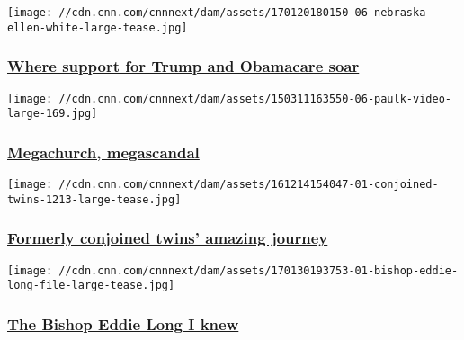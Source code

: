 \href{/2017/01/24/health/nebraska-trump-obamacare-aca-eprise/index.html}{}

\texttt{[image: //cdn.cnn.com/cnnnext/dam/assets/170120180150-06-nebraska-ellen-white-large-tease.jpg]}

\hypertarget{where-support-for-trump-and-obamacare-soar}{%
\subsubsection{\texorpdfstring{\href{/2017/01/24/health/nebraska-trump-obamacare-aca-eprise/index.html}{Where
support for Trump and Obamacare
soar}}{Where support for Trump and Obamacare soar}}\label{where-support-for-trump-and-obamacare-soar}}

\href{http://www.cnn.com/interactive/2015/03/living/ultimate-scandal-paulk/}{}

\texttt{[image: //cdn.cnn.com/cnnnext/dam/assets/150311163550-06-paulk-video-large-169.jpg]}

\hypertarget{megachurch-megascandal}{%
\subsubsection{\texorpdfstring{\href{http://www.cnn.com/interactive/2015/03/living/ultimate-scandal-paulk/}{Megachurch,
megascandal}}{Megachurch, megascandal}}\label{megachurch-megascandal}}

\href{/2017/09/07/health/conjoined-twins-go-home-main/index.html}{}

\texttt{[image: //cdn.cnn.com/cnnnext/dam/assets/161214154047-01-conjoined-twins-1213-large-tease.jpg]}

\hypertarget{formerly-conjoined-twins-amazing-journey}{%
\subsubsection{\texorpdfstring{\href{/2017/09/07/health/conjoined-twins-go-home-main/index.html}{Formerly
conjoined twins' amazing
journey}}{Formerly conjoined twins' amazing journey}}\label{formerly-conjoined-twins-amazing-journey}}

\href{/2017/02/03/us/bishop-eddie-long-i-knew/index.html}{}

\texttt{[image: //cdn.cnn.com/cnnnext/dam/assets/170130193753-01-bishop-eddie-long-file-large-tease.jpg]}

\hypertarget{the-bishop-eddie-long-i-knew}{%
\subsubsection{\texorpdfstring{\href{/2017/02/03/us/bishop-eddie-long-i-knew/index.html}{The
Bishop Eddie Long I
knew}}{The Bishop Eddie Long I knew}}\label{the-bishop-eddie-long-i-knew}}

